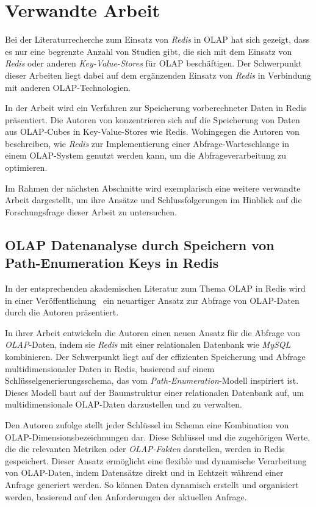 \chapter{Verwandte Arbeit}
Bei der Literaturrecherche zum Einsatz von \emph{Redis} in OLAP hat sich gezeigt, dass es nur eine begrenzte Anzahl von Studien gibt, die sich mit dem  Einsatz von \emph{Redis} oder anderen \emph{Key-Value-Stores} für OLAP beschäftigen. Der Schwerpunkt dieser Arbeiten liegt dabei auf dem ergänzenden Einsatz von \emph{Redis} in Verbindung mit anderen OLAP-Technologien.

In der Arbeit \cite{franciscus_answering_2017} wird ein Verfahren zur Speicherung vorberechneter Daten in Redis präsentiert. Die Autoren von \cite{zhao_multidimensional_2014} konzentrieren sich auf die Speicherung von Daten aus OLAP-Cubes in Key-Value-Stores wie Redis. Wohingegen die Autoren von \cite{ly_implementation_2017} beschreiben, wie \emph{Redis} zur Implementierung einer Abfrage-Warteschlange in einem OLAP-System genutzt werden kann, um die Abfrageverarbeitung zu optimieren.

Im Rahmen der nächsten Abschnitte wird exemplarisch eine weitere verwandte Arbeit dargestellt, um ihre Ansätze und Schlussfolgerungen im Hinblick auf die Forschungsfrage dieser Arbeit zu untersuchen.




\section{OLAP Datenanalyse durch Speichern von Path-Enumeration Keys in Redis}
In der entsprechenden akademischen Literatur zum Thema OLAP in Redis wird in einer Veröffentlichung~\cite{loyola_building_2012} ein neuartiger Ansatz zur Abfrage von OLAP-Daten durch die Autoren präsentiert.

In ihrer Arbeit entwickeln die Autoren einen neuen Ansatz für die Abfrage von \emph{OLAP}-Daten, indem sie \emph{Redis} mit einer relationalen Datenbank wie \emph{MySQL} kombinieren. Der Schwerpunkt liegt auf der effizienten Speicherung und Abfrage multidimensionaler Daten in Redis, basierend auf einem Schlüsselgenerierungsschema, das vom \emph{Path-Enumeration}-Modell inspiriert ist. Dieses Modell baut auf der Baumstruktur einer relationalen Datenbank auf, um multidimensionale OLAP-Daten darzustellen und zu verwalten.

Den Autoren zufolge stellt jeder Schlüssel im Schema eine Kombination von OLAP-Dimensionsbezeichnungen dar. Diese Schlüssel und die zugehörigen Werte, die die relevanten Metriken oder \emph{OLAP-Fakten} darstellen, werden in Redis gespeichert. Dieser Ansatz ermöglicht eine flexible und dynamische Verarbeitung von OLAP-Daten, indem Datensätze direkt und in Echtzeit während einer Anfrage generiert werden. So können Daten dynamisch erstellt und organisiert werden, basierend auf den Anforderungen der aktuellen Anfrage.

